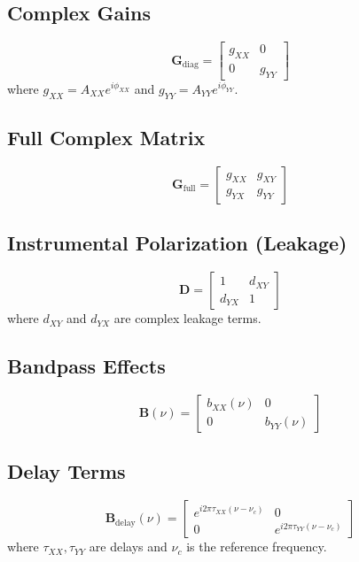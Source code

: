 \documentclass{aastex631}
\begin{document}
\subsection{Complex Gains}
\begin{equation}
\mathbf{G}_{\mathrm{diag}} = \begin{bmatrix} g_{XX} & 0 \\ 0 & g_{YY} \end{bmatrix}
\end{equation}
where $g_{XX} = A_{XX} e^{i\phi_{XX}}$ and $g_{YY} = A_{YY} e^{i\phi_{YY}}$.

\subsection{Full Complex Matrix}
\begin{equation}
\mathbf{G}_{\mathrm{full}} = \begin{bmatrix} g_{XX} & g_{XY} \\ g_{YX} & g_{YY} \end{bmatrix}
\end{equation}

\subsection{Instrumental Polarization (Leakage)}
\begin{equation}
\mathbf{D} = \begin{bmatrix} 1 & d_{XY} \\ d_{YX} & 1 \end{bmatrix}
\end{equation}
where $d_{XY}$ and $d_{YX}$ are complex leakage terms.

\subsection{Bandpass Effects}
\begin{equation}
\mathbf{B}(\nu) = \begin{bmatrix} b_{XX}(\nu) & 0 \\ 0 & b_{YY}(\nu) \end{bmatrix}
\end{equation}

\subsection{Delay Terms}
\begin{equation}
\mathbf{B}_{\mathrm{delay}}(\nu) = \begin{bmatrix} 
e^{i 2\pi \tau_{XX}(\nu - \nu_c)} & 0 \\ 
0 & e^{i 2\pi \tau_{YY}(\nu - \nu_c)} 
\end{bmatrix}
\end{equation}
where $\tau_{XX}, \tau_{YY}$ are delays and $\nu_c$ is the reference frequency.
\end{document}
